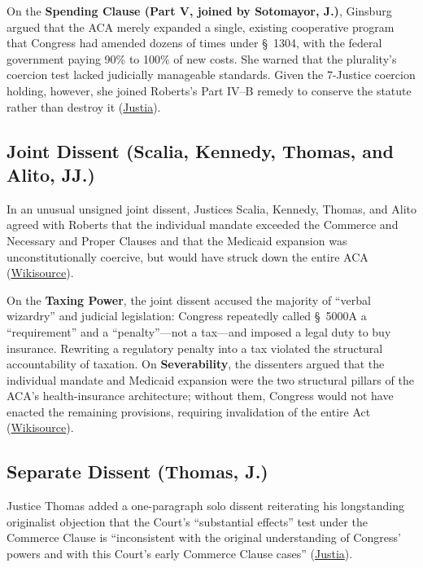 \documentclass[12pt]{article}
\begin{document}
On the \textbf{Spending Clause (Part V, joined by Sotomayor, J.)}, Ginsburg argued that the ACA merely expanded a single, existing cooperative program that Congress had amended dozens of times under \S~1304, with the federal government paying 90\% to 100\% of new costs. She warned that the plurality's coercion test lacked judicially manageable standards. Given the 7-Justice coercion holding, however, she joined Roberts's Part IV--B remedy to conserve the statute rather than destroy it (\href{https://supreme.justia.com/cases/federal/us/567/519/}{Justia}).

\subsection{Joint Dissent (Scalia, Kennedy, Thomas, and Alito, JJ.)}
In an unusual unsigned joint dissent, Justices Scalia, Kennedy, Thomas, and Alito agreed with Roberts that the individual mandate exceeded the Commerce and Necessary and Proper Clauses and that the Medicaid expansion was unconstitutionally coercive, but would have struck down the entire ACA (\href{https://en.wikisource.org/wiki/National_Federation_of_Independent_Business_v._Sebelius/Dissent_Scalia,_Kennedy,_Thomas,_and_Alito}{Wikisource}).

On the \textbf{Taxing Power}, the joint dissent accused the majority of ``verbal wizardry'' and judicial legislation: Congress repeatedly called \S~5000A a ``requirement'' and a ``penalty''---not a tax---and imposed a legal duty to buy insurance. Rewriting a regulatory penalty into a tax violated the structural accountability of taxation. On \textbf{Severability}, the dissenters argued that the individual mandate and Medicaid expansion were the two structural pillars of the ACA's health-insurance architecture; without them, Congress would not have enacted the remaining provisions, requiring invalidation of the entire Act (\href{https://en.wikisource.org/wiki/National_Federation_of_Independent_Business_v._Sebelius/Dissent_Scalia,_Kennedy,_Thomas,_and_Alito}{Wikisource}).

\subsection{Separate Dissent (Thomas, J.)}
Justice Thomas added a one-paragraph solo dissent reiterating his longstanding originalist objection that the Court's ``substantial effects'' test under the Commerce Clause is ``inconsistent with the original understanding of Congress' powers and with this Court's early Commerce Clause cases'' (\href{https://supreme.justia.com/cases/federal/us/567/519/}{Justia}).
\end{document}
